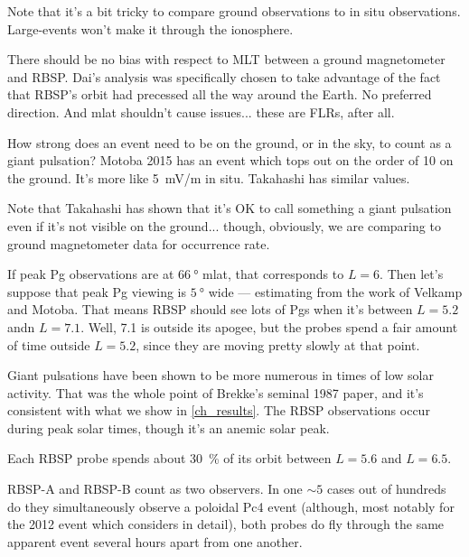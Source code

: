 
Note that it's a bit tricky to compare ground observations to in situ observations. Large-\azm events won't make it through the ionosphere. 

There should be no bias with respect to MLT between a ground magnetometer and RBSP. Dai's analysis was specifically chosen to take advantage of the fact that RBSP's orbit had precessed all the way around the Earth. No preferred direction. And mlat shouldn't cause issues... these are FLRs, after all. 

How strong does an event need to be on the ground, or in the sky, to count as a giant pulsation? Motoba 2015\cite{motoba_2015} has an event which tops out on the order of \SI{10}{\nT} on the ground. It's more like \SI{5}{\mV/\m} in situ. Takahashi\cite{takahashi_2011} has similar values. 

Note that Takahashi\cite{takahashi_2013} has shown that it's OK to call something a giant pulsation even if it's not visible on the ground... though, obviously, we are comparing to ground magnetometer data for occurrence rate. 

If peak Pg observations are at $\SI{66}{\degree}$ mlat, that corresponds to $L = 6$. Then let's suppose that peak Pg viewing is $\SI{5}{\degree}$ wide --- estimating from the work of Velkamp and Motoba. That means RBSP should see lots of Pgs when it's between $L = 5.2$ andn $L = 7.1$. Well, \SI{7.1}{\RE} is outside its apogee, but the probes spend a fair amount of time outside $L = 5.2$, since they are moving pretty slowly at that point. 

Giant pulsations have been shown to be more numerous in times of low solar activity. That was the whole point of Brekke's seminal 1987 paper, and it's consistent with what we show in \cref{ch_results}. The RBSP observations occur during peak solar times, though it's an anemic solar peak\cite{pesnell_2016}. 


Each RBSP probe spends about \SI{30}{\percent} of its orbit between $L = 5.6$ and $L = 6.5$. 

RBSP-A and RBSP-B count as two observers. In one $\sim 5$ cases out of hundreds do they simultaneously observe a poloidal Pc4 event (although, most notably for the 2012 event which \cite{dai_2013} considers in detail), both probes do fly through the same apparent event several hours apart from one another. 


